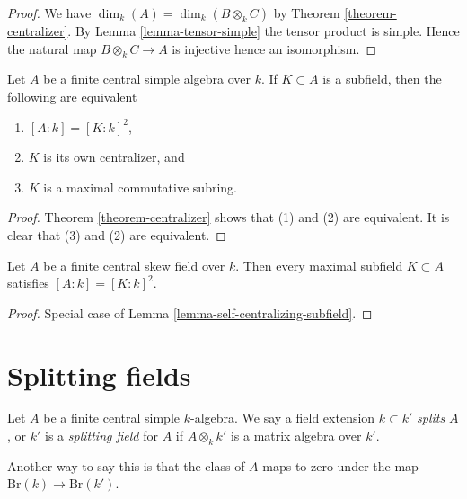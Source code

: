 \begin{proof}
We have $\dim_k(A) = \dim_k(B \otimes_k C)$ by
Theorem \ref{theorem-centralizer}. By
Lemma \ref{lemma-tensor-simple}
the tensor product is simple. Hence the natural map
$B \otimes_k C \to A$ is injective hence an isomorphism.
\end{proof}

\begin{lemma}
\label{lemma-self-centralizing-subfield}
Let $A$ be a finite central simple algebra over $k$.
If $K \subset A$ is a subfield, then the following are equivalent
\begin{enumerate}
\item $[A : k] = [K : k]^2$,
\item $K$ is its own centralizer, and
\item $K$ is a maximal commutative subring.
\end{enumerate}
\end{lemma}

\begin{proof}
Theorem \ref{theorem-centralizer}
shows that (1) and (2) are equivalent.
It is clear that (3) and (2) are equivalent.
\end{proof}

\begin{lemma}
\label{lemma-maximal-subfield}
Let $A$ be a finite central skew field over $k$.
Then every maximal subfield $K \subset A$ satisfies
$[A : k] = [K : k]^2$.
\end{lemma}

\begin{proof}
Special case of Lemma \ref{lemma-self-centralizing-subfield}.
\end{proof}





\section{Splitting fields}
\label{section-splitting}


\begin{definition}
\label{definition-splitting}
Let $A$ be a finite central simple $k$-algebra.
We say a field extension $k \subset k'$ {\it splits} $A$, or
$k'$ is a {\it splitting field} for $A$ if $A \otimes_k k'$ is
a matrix algebra over $k'$.
\end{definition}

\noindent
Another way to say this is that the class of $A$ maps to zero
under the map $\text{Br}(k) \to \text{Br}(k')$.

